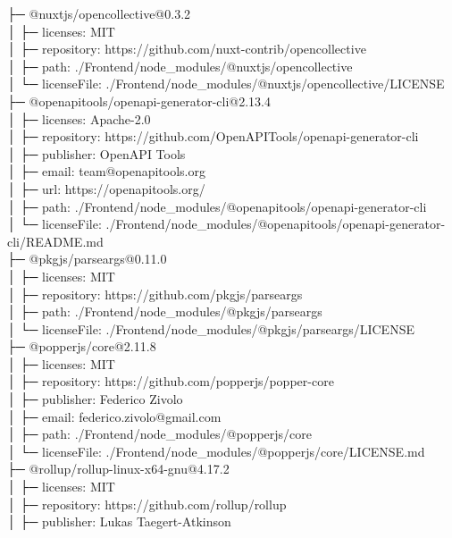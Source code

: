 \documentclass[
    paper=a4,
    twoside=false,
    parskip=half,
    listof=entryprefix,
    listof=totoc,
    index=totoc,
    bibliography=totoc,
    headsepline,
]{scrbook}
\begin{document}
    ├─ @nuxtjs/opencollective@0.3.2\\
    │  ├─ licenses: MIT\\
    │  ├─ repository: https://github.com/nuxt-contrib/opencollective\\
    │  ├─ path: ./Frontend/node\_modules/@nuxtjs/opencollective\\
    │  └─ licenseFile: ./Frontend/node\_modules/@nuxtjs/opencollective/LICENSE\\
    ├─ @openapitools/openapi-generator-cli@2.13.4\\
    │  ├─ licenses: Apache-2.0\\
    │  ├─ repository: https://github.com/OpenAPITools/openapi-generator-cli\\
    │  ├─ publisher: OpenAPI Tools\\
    │  ├─ email: team@openapitools.org\\
    │  ├─ url: https://openapitools.org/\\
    │  ├─ path: ./Frontend/node\_modules/@openapitools/openapi-generator-cli\\
    │  └─ licenseFile: ./Frontend/node\_modules/@openapitools/openapi-generator-cli/README.md\\
    ├─ @pkgjs/parseargs@0.11.0\\
    │  ├─ licenses: MIT\\
    │  ├─ repository: https://github.com/pkgjs/parseargs\\
    │  ├─ path: ./Frontend/node\_modules/@pkgjs/parseargs\\
    │  └─ licenseFile: ./Frontend/node\_modules/@pkgjs/parseargs/LICENSE\\
    ├─ @popperjs/core@2.11.8\\
    │  ├─ licenses: MIT\\
    │  ├─ repository: https://github.com/popperjs/popper-core\\
    │  ├─ publisher: Federico Zivolo\\
    │  ├─ email: federico.zivolo@gmail.com\\
    │  ├─ path: ./Frontend/node\_modules/@popperjs/core\\
    │  └─ licenseFile: ./Frontend/node\_modules/@popperjs/core/LICENSE.md\\
    ├─ @rollup/rollup-linux-x64-gnu@4.17.2\\
    │  ├─ licenses: MIT\\
    │  ├─ repository: https://github.com/rollup/rollup\\
    │  ├─ publisher: Lukas Taegert-Atkinson\\
\end{document}
